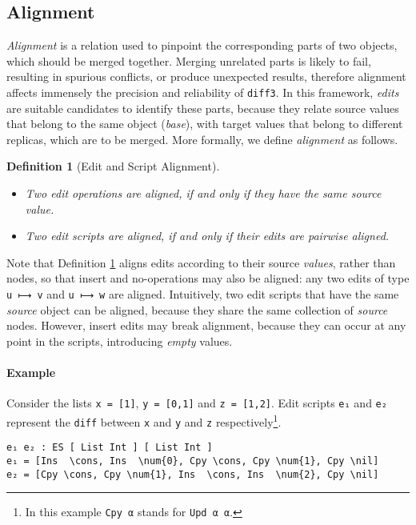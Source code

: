 \documentclass{sigplanconf}
\theoremstyle{plain}
\newtheorem{definition}{Definition}
\newcommand{\nil}{\textcolor{blue}{\texttt{[]}}}
\newcommand{\cons}{\texttt{(\textcolor{blue}{∷})}}
\newcommand{\num}[1]{\textcolor{magenta}{\texttt{#1}}}
\begin{document}
\subsection{Alignment}
\label{subsec:alignment}
%
\emph{Alignment} is a relation used to pinpoint the corresponding
parts of two objects, which should be merged together.
%
Merging unrelated parts is likely to fail, resulting in spurious
conflicts, or produce unexpected results, therefore alignment affects
immensely the precision and reliability of \texttt{diff3}.
%
In this framework, \emph{edits} are suitable candidates to identify
these parts, because they relate source values that belong to the same
object (\emph{base}), with target values that belong to different
replicas, which are to be merged.
%
More formally, we define \emph{alignment} as follows.
\begin{definition}[Edit and Script Alignment]
\mbox{}
\label{def:align}
\begin{itemize}
  \item Two edit operations are aligned, if and only if they have the same source value.
  \item Two edit scripts are aligned, if and only if their edits are
    pairwise aligned.
\end{itemize}
\end{definition}
Note that Definition \ref{def:align} aligns edits according to their
source \emph{values}, rather than nodes, so that insert and
no-operations may also be aligned: any two edits of type \texttt{u ⟼
  v} and \texttt{u ⟼ w} are aligned.
%	
Intuitively, two edit scripts that have the same \emph{source} object
can be aligned, because they share the same collection of
\emph{source} nodes.
%
However, insert edits may break alignment, because they can occur at
any point in the scripts, introducing \emph{empty} values.

\paragraph{Example}
Consider the lists \texttt{x = [1]}, \texttt{y = [0,1]} and \texttt{z
  = [1,2]}.
%
Edit scripts \texttt{e₁} and \texttt{e₂} represent the \texttt{diff}
between \texttt{x} and \texttt{y} and \texttt{z}
respectively\footnote{In this example \texttt{Cpy α} stands for \texttt{Upd α α}.}.
\begin{Verbatim}[commandchars=\\\{\}]
e₁ e₂ : ES [ List Int ] [ List Int ]
e₁ = [Ins  \cons, Ins  \num{0}, Cpy \cons, Cpy \num{1}, Cpy \nil]
e₂ = [Cpy \cons, Cpy \num{1}, Ins  \cons, Ins  \num{2}, Cpy \nil] 
\end{Verbatim}       
\end{document}
